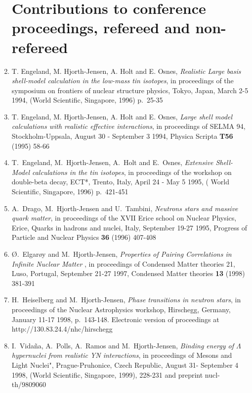 \begin{enumerate}
\section*{Contributions to conference proceedings, refereed and non-refereed}
\item
    T. Engeland, M. Hjorth-Jensen, A. Holt and E. Osnes,
    {\em Realistic Large basis shell-model calculation
         in the low-mass tin isotopes},
    in proceedings of the symposium on frontiers of nuclear
    structure physics, Tokyo, Japan, March 2-5 1994, 
    (World Scientific, Singapore, 1996)
    p.\ 25-35
\item
    T. Engeland, M. Hjorth-Jensen, A. Holt and E. Osnes,
    {\em Large shell model calculations with realistic effective interactions},
    in proceedings of SELMA 94, Stockholm-Uppsala, August 30 - September 3 1994,
    Physica Scripta {\bf T56} (1995) 58-66
\item
    T.\ Engeland, M.\ Hjorth-Jensen, A.\ Holt and E.\ Osnes,
    {\em Extensive Shell-Model calculations in the tin isotopes},
    in proceedings of the workshop on double-beta decay, ECT*, Trento,
    Italy, April 24  - May 5 1995, (
    World Scientific, Singapore, 1996) p.\ 421-451
\item
    A.\ Drago, M.\ Hjorth-Jensen and U.\ Tambini,
    {\em Neutrons stars and massive quark matter}, in proceedings
    of the XVII Erice school on Nuclear Physics, Erice, 
    Quarks in hadrons and nuclei, Italy,
    September 19-27 1995, 
    Progress of Particle and Nuclear Physics {\bf 36} (1996) 407-408
\item
    \O.\ Elgar\o y and
    M.\ Hjorth-Jensen,
    {\em  Properties of Pairing Correlations in Infinite Nuclear Matter }, in proceedings of
    Condensed Matter theories 21, Luso, Portugal, September 21-27 1997,
    Condensed Matter theories {\bf 13} (1998) 381-391
\item 
    H.\ Heiselberg and M.\ Hjorth-Jensen,
    {\em Phase transitions in neutron stars}, 
    in proceedings of the Nuclear Astrophysics workshop, Hirschegg,
    Germany, January 11-17 1998, p.\ 143-148.
    Electronic version of proceedings at 
    http://130.83.24.4/nhc/hirschegg 
\item I.\ Vida\~na, A.\ Polls, A.\ Ramos and  
       M.\ Hjorth-Jensen,
    {\em Binding energy of $\Lambda$ hypernuclei from realistic YN interactions},
    in proceedings of Mesons and Light Nuclei", Prague-Pruhonice, 
    Czech Republic, August 31-
    September 4 1998,     (World Scientific, Singapore, 1999), 228-231 
    and preprint nucl-th/9809060


\end{enumerate}
